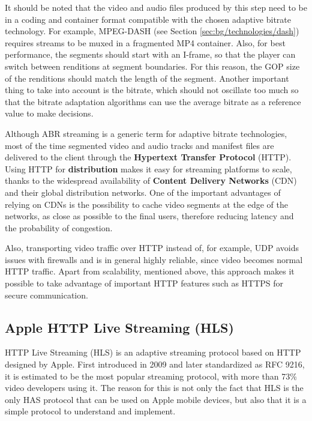 It should be noted that the video and audio files produced by this step need to be in a coding and container format compatible with the chosen adaptive bitrate technology. For example, MPEG-DASH (see Section \ref{sec:bg/technologies/dash}) requires streams to be muxed in a fragmented MP4 container. Also, for best performance, the segments should start with an I-frame, so that the player can switch between renditions at segment boundaries. For this reason, the GOP size of the renditions should match the length of the segment. Another important thing to take into account is the bitrate, which should not oscillate too much so that the bitrate adaptation algorithms can use the average bitrate as a reference value to make decisions.\cite{ozer}

Although ABR streaming is a generic term for adaptive bitrate technologies, most of the time segmented video and audio tracks and manifest files are delivered to the client through the \textbf{Hypertext Transfer Protocol} (HTTP). Using HTTP for \textbf{distribution} makes it easy for streaming platforms to scale, thanks to the widespread availability of \textbf{Content Delivery Networks} (CDN) and their global distribution networks. One of the important advantages of relying on CDNs is the possibility to cache video segments at the edge of the networks, as close as possible to the final users, therefore reducing latency and the probability of congestion.

Also, transporting video traffic over HTTP instead of, for example, UDP avoids issues with firewalls and is in general highly reliable, since video becomes normal HTTP traffic. Apart from scalability, mentioned above, this approach makes it possible to take advantage of important HTTP features such as HTTPS for secure communication.

\subsection{Apple HTTP Live Streaming (HLS)}
\label{sec:bg/abr/hls}

HTTP Live Streaming (HLS) is an adaptive streaming protocol based on HTTP designed by Apple. First introduced in 2009 and later standardized as RFC 9216, it is estimated to be the most popular streaming protocol, with more than 73\% video developers using it.\cite{rfc8216}\cite{bitmovin} The reason for this is not only the fact that HLS is the only HAS protocol that can be used on Apple mobile devices, but also that it is a simple protocol to understand and implement.

